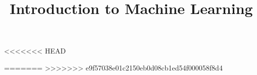 \documentclass[11pt,compress,t,notes=noshow, xcolor=table]{beamer}
\title{Introduction to Machine Learning}
\institute{\href{https://compstat-lmu.github.io/lecture_i2ml/}{compstat-lmu.github.io/lecture\_i2ml}}
\date{}
\begin{document}
<<<<<<< HEAD
















=======
>>>>>>> e9f57038e01c2150eb0d08cb1ed54f000058f8d4
\sloppy
\end{document}
